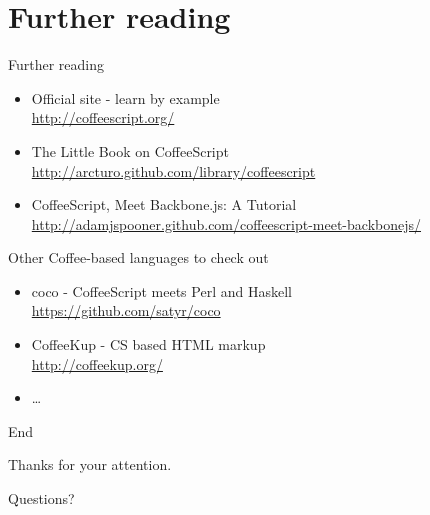 \documentclass[xcolor=dvipsnames]{beamer}
\newcommand{\slide}[1]{\begin{frame}[fragile]{{#1}}}
\begin{document}
\section{Further reading}
\slide{Further reading}
    \begin{itemize}
        \item Official site - learn by example \\
            \url{http://coffeescript.org/}
        \item The Little Book on CoffeeScript \\
            \url{http://arcturo.github.com/library/coffeescript}
        \item CoffeeScript, Meet Backbone.js: A Tutorial \\
            \url{http://adamjspooner.github.com/coffeescript-meet-backbonejs/}
    \end{itemize}

    Other Coffee-based languages to check out
    \begin{itemize}
        \item coco - CoffeeScript meets Perl and Haskell \\
            \url{https://github.com/satyr/coco}
        \item CoffeeKup - CS based HTML markup \\
            \url{http://coffeekup.org/}
        \item \ldots
    \end{itemize}
\end{frame}


\slide{End}
    \begin{center}
        Thanks for your attention.
        
        \vspace{2 cm}
        \pause
        Questions?
    \end{center}
\end{frame}
\end{document}
